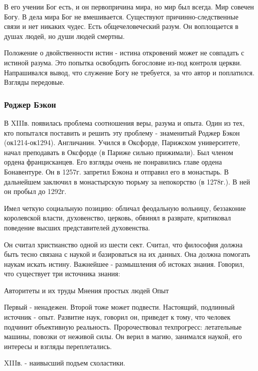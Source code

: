     В его учении Бог есть, и он первопричина мира, но мир был всегда. Мир совечен Богу. В дела мира Бог не вмешивается. Существуют причинно-следственные связи и нет никаких чудес. Есть общечеловеческий разум. Он воплощается в душах людей, но души людей смертны.

Положение о двойственности истин - истина откровений может не совпадать с истиной разума. Это попытка освободить богословие из-под контроля церкви. Напрашивался вывод, что служение Богу не требуется, за что автор и поплатился. Взгляды передовые.
\subsubsection{Роджер Бэкон}

В XIIIв. появилась проблема соотношения веры, разума и опыта. Один из тех, кто попытался поставить и решить эту проблему - знаменитый Роджер Бэкон (ок1214-ок1294). Англичанин. Учился в Оксфорде, Парижском университете, начал преподавать в Оксфорде (в Париже сильно прижимали). Был членом ордена францисканцев. Его взгляды очень не понравились главе ордена Бонавентуре. Он в 1257г. запретил Бэкона и отправил его в монастырь. В дальнейшем заключил в монастырскую тюрьму за непокорство (в 1278г.). В ней он пробыл до 1292г.

    Имел четкую социальную позицию: обличал феодальную вольницу, беззаконие королевской власти, духовенство, церковь, обвинял в разврате, критиковал поведение высших представителей духовенства.

Он считал христианство одной из шести сект. Считал, что философия должна быть тесно связана с наукой и базироваться на их данных. Она должна помогать наукам искать истину. Важнейшее - размышления об истоках знания. Говорил, что существует три источника знания:

    Авторитеты и их труды
    Мнения простых людей
    Опыт

Первый - ненадежен. Второй тоже может подвести. Настоящий, подлинный источник - опыт. Развитие наук, говорил он, приведет к тому, что человек подчинит объективную реальность. Пророчествовал техпрогресс: летательные машины, повозки от неживой силы. Он верил в магию, занимался наукой, его интересы и взгляды переплетались.

XIIIв. - наивысший подъем схоластики.


